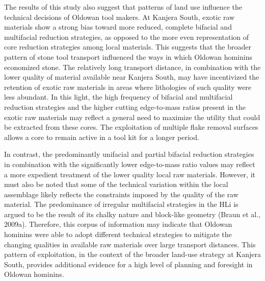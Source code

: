 \documentclass[]{elsarticle} %
\begin{document}
The results of this study also suggest that patterns of land use
influence the technical decisions of Oldowan tool makers. At Kanjera
South, exotic raw materials show a strong bias toward more reduced,
complete bifacial and multifacial reduction strategies, as opposed to
the more even representation of core reduction strategies among local
materials. This suggests that the broader pattern of stone tool
transport influenced the ways in which Oldowan hominins economized
stone. The relatively long transport distance, in combination with the
lower quality of material available near Kanjera South, may have
incentivized the retention of exotic raw materials in areas where
lithologies of such quality were less abundant. In this light, the high
frequency of bifacial and multifacial reduction strategies and the
higher cutting edge-to-mass ratios present in the exotic raw materials
may reflect a general need to maximize the utility that could be
extracted from these cores. The exploitation of multiple flake removal
surfaces allows a core to remain active in a tool kit for a longer
period.

In contrast, the predominantly unifacial and partial bifacial reduction
strategies in combination with the significantly lower edge-to-mass
ratio values may reflect a more expedient treatment of the lower quality
local raw materials. However, it must also be noted that some of the
technical variation within the local assemblage likely reflects the
constraints imposed by the quality of the raw material. The predominance
of irregular multifacial strategies in the HLi is argued to be the
result of its chalky nature and block-like geometry (\hspace{0pt}Braun
et al., 2009a\hspace{0pt}). Therefore, this corpus of information may
indicate that Oldowan hominins were able to adopt different technical
strategies to mitigate the changing qualities in available raw materials
over large transport distances. This pattern of exploitation, in the
context of the broader land-use strategy at Kanjera South, provides
additional evidence for a high level of planning and foresight in
Oldowan hominins.
\end{document}
